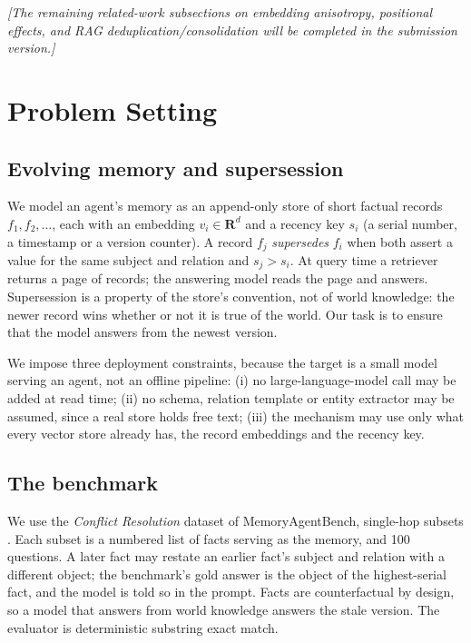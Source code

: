 \documentclass[journal=jcisd8,manuscript=article]{achemso}
\begin{document}
\emph{[The remaining related-work subsections on embedding anisotropy, positional effects, and RAG deduplication/consolidation will be completed in the submission version.]}

\section{Problem Setting}
\label{sec:problem}

\subsection{Evolving memory and supersession}

We model an agent's memory as an append-only store of short factual records $f_1,f_2,\dots$, each with an embedding $v_i\in\mathbf{R}^d$ and a recency key $s_i$ (a serial number, a timestamp or a version counter). A record $f_j$ \emph{supersedes} $f_i$ when both assert a value for the same subject and relation and $s_j>s_i$. At query time a retriever returns a page of records; the answering model reads the page and answers. Supersession is a property of the store's convention, not of world knowledge: the newer record wins whether or not it is true of the world. Our task is to ensure that the model answers from the newest version.

We impose three deployment constraints, because the target is a small model serving an agent, not an offline pipeline: (i) no large-language-model call may be added at read time; (ii) no schema, relation template or entity extractor may be assumed, since a real store holds free text; (iii) the mechanism may use only what every vector store already has, the record embeddings and the recency key.

\subsection{The benchmark}

We use the \emph{Conflict Resolution} dataset of MemoryAgentBench, single-hop subsets . Each subset is a numbered list of facts serving as the memory, and 100 questions. A later fact may restate an earlier fact's subject and relation with a different object; the benchmark's gold answer is the object of the highest-serial fact, and the model is told so in the prompt. Facts are counterfactual by design, so a model that answers from world knowledge answers the stale version. The evaluator is deterministic substring exact match.
\end{document}
